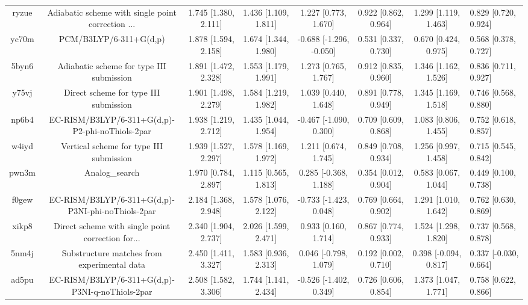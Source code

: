 \documentclass{article}
\begin{document}
\begin{center}
\begin{longtable}{|ccccccc|}
 ryzue &  Adiabatic scheme with single point correction ... &  1.745 [1.380, 2.111] &  1.436 [1.109, 1.811] &     1.227 [0.773, 1.670] &  0.922 [0.862, 0.964] &   1.299 [1.119, 1.463] &   0.829 [0.720, 0.924] \\
 yc70m &                             PCM/B3LYP/6-311+G(d,p) &  1.878 [1.594, 2.158] &  1.674 [1.344, 1.980] &  -0.688 [-1.296, -0.050] &  0.531 [0.337, 0.730] &   0.670 [0.424, 0.975] &   0.568 [0.378, 0.727] \\
 5byn6 &           Adiabatic scheme for type III submission &  1.891 [1.472, 2.328] &  1.553 [1.179, 1.991] &     1.273 [0.765, 1.767] &  0.912 [0.835, 0.960] &   1.346 [1.162, 1.526] &   0.836 [0.711, 0.927] \\
 y75vj &              Direct scheme for type III submission &  1.901 [1.498, 2.279] &  1.584 [1.219, 1.982] &     1.039 [0.440, 1.648] &  0.891 [0.778, 0.949] &   1.345 [1.169, 1.518] &   0.746 [0.568, 0.880] \\
 np6b4 &    EC-RISM/B3LYP/6-311+G(d,p)-P2-phi-noThiols-2par &  1.938 [1.219, 2.712] &  1.435 [1.044, 1.954] &   -0.467 [-1.090, 0.300] &  0.709 [0.609, 0.868] &   1.083 [0.806, 1.455] &   0.752 [0.618, 0.857] \\
 w4iyd &            Vertical scheme for type III submission &  1.939 [1.527, 2.297] &  1.578 [1.169, 1.972] &     1.211 [0.674, 1.745] &  0.849 [0.708, 0.934] &   1.256 [0.997, 1.458] &   0.715 [0.545, 0.842] \\
 pwn3m &                                     Analog\_search &  1.970 [0.784, 2.897] &  1.115 [0.565, 1.813] &    0.285 [-0.368, 1.188] &  0.354 [0.012, 0.904] &   0.583 [0.067, 1.044] &   0.449 [0.100, 0.738] \\
 f0gew &  EC-RISM/B3LYP/6-311+G(d,p)-P3NI-phi-noThiols-2par &  2.184 [1.368, 2.948] &  1.578 [1.076, 2.122] &   -0.733 [-1.423, 0.048] &  0.769 [0.664, 0.902] &   1.291 [1.010, 1.642] &   0.762 [0.630, 0.869] \\
 xikp8 &  Direct scheme with single point correction for... &  2.340 [1.904, 2.737] &  2.026 [1.599, 2.471] &     0.933 [0.160, 1.714] &  0.867 [0.774, 0.933] &   1.524 [1.298, 1.820] &   0.737 [0.568, 0.878] \\
 5nm4j &        Substructure matches from experimental data &  2.450 [1.411, 3.327] &  1.583 [0.936, 2.313] &    0.046 [-0.798, 1.079] &  0.192 [0.002, 0.710] &  0.398 [-0.094, 0.817] &  0.337 [-0.030, 0.664] \\
 ad5pu &    EC-RISM/B3LYP/6-311+G(d,p)-P3NI-q-noThiols-2par &  2.508 [1.582, 3.306] &  1.744 [1.141, 2.434] &   -0.526 [-1.402, 0.349] &  0.726 [0.606, 0.854] &   1.373 [1.047, 1.771] &   0.758 [0.622, 0.866] \\

\end{longtable}
\end{center}
\end{document}
